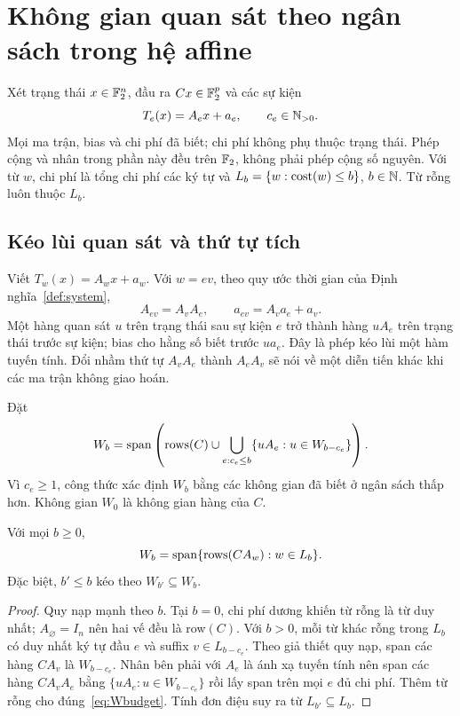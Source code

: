 \section{Không gian quan sát theo ngân sách trong hệ affine}\label{sec:linear}
Xét trạng thái $x\in\mathbb F_2^n$, đầu ra $Cx\in\mathbb F_2^p$ và các sự kiện
\[
T_e(x)=A_ex+a_e,\qquad c_e\in\mathbb N_{>0}.
\]
Mọi ma trận, bias và chi phí đã biết; chi phí không phụ thuộc trạng thái. Phép cộng và nhân trong phần này đều trên $\mathbb F_2$, không phải phép cộng số nguyên. Với từ $w$, chi phí là tổng chi phí các ký tự và $L_b=\{w:\operatorname{cost}(w)\le b\}$, $b\in\mathbb N$. Từ rỗng luôn thuộc $L_b$.

\subsection{Kéo lùi quan sát và thứ tự tích}
Viết $T_w(x)=A_wx+a_w$. Với $w=ev$, theo quy ước thời gian của Định nghĩa~\ref{def:system},
\[
A_{ev}=A_vA_e,\qquad a_{ev}=A_va_e+a_v.
\]
Một hàng quan sát $u$ trên trạng thái sau sự kiện $e$ trở thành hàng $uA_e$ trên trạng thái trước sự kiện; bias cho hằng số biết trước $ua_e$. Đây là phép kéo lùi một hàm tuyến tính. Đổi nhầm thứ tự $A_vA_e$ thành $A_eA_v$ sẽ nói về một diễn tiến khác khi các ma trận không giao hoán.

Đặt
\begin{equation}\label{eq:Wbudget}
W_b=\operatorname{span}\left(\operatorname{rows}(C)\cup
\bigcup_{e:c_e\le b}\{uA_e:u\in W_{b-c_e}\}\right).
\end{equation}
Vì $c_e\ge1$, công thức xác định $W_b$ bằng các không gian đã biết ở ngân sách thấp hơn. Không gian $W_0$ là không gian hàng của $C$.

\begin{lemma}\label{lem:wordspace}
Với mọi $b\ge0$,
\[
W_b=\operatorname{span}\{\operatorname{rows}(CA_w):w\in L_b\}.
\]
Đặc biệt, $b'\le b$ kéo theo $W_{b'}\subseteq W_b$.
\end{lemma}
\begin{proof}
Quy nạp mạnh theo $b$. Tại $b=0$, chi phí dương khiến từ rỗng là từ duy nhất; $A_{\varnothing}=I_n$ nên hai vế đều là row$(C)$. Với $b>0$, mỗi từ khác rỗng trong $L_b$ có duy nhất ký tự đầu $e$ và suffix $v\in L_{b-c_e}$. Theo giả thiết quy nạp, span các hàng $CA_v$ là $W_{b-c_e}$. Nhân bên phải với $A_e$ là ánh xạ tuyến tính nên span các hàng $CA_vA_e$ bằng $\{uA_e:u\in W_{b-c_e}\}$ rồi lấy span trên mọi $e$ đủ chi phí. Thêm từ rỗng cho đúng~\eqref{eq:Wbudget}. Tính đơn điệu suy ra từ $L_{b'}\subseteq L_b$.
\end{proof}

